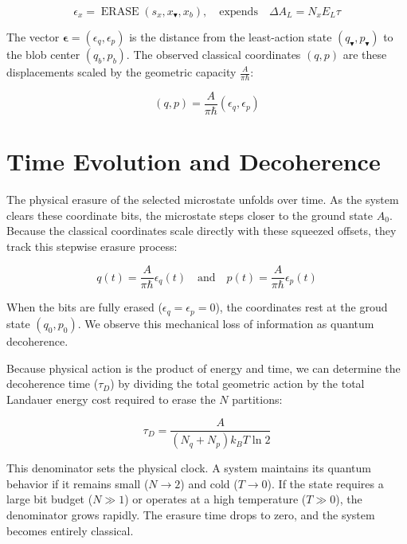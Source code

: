 \documentclass[%
  aps, reprint, prl, amsmath,amssymb
]{revtex4-2}
\begin{document}
\begin{equation}
\label{eq:ErasureFunction}
\epsilon_x = \operatorname{ERASE}(s_x, x_\blacktriangledown, x_b), \quad \text{expends} \quad \Delta A_L = N_x E_L \tau
\end{equation}

The vector $\mathbf{\epsilon} = (\epsilon_q,\epsilon_p)$ is the distance from the least-action state $(q_\blacktriangledown, p_\blacktriangledown)$ to the blob center $(q_b, p_b)$. The observed classical coordinates $(q,p)$ are these displacements scaled by the geometric capacity $\frac{A}{\pi \hbar}$:

\begin{equation}
\label{eq:ObservedCoordinates}
(q,p) = \frac{A}{\pi \hbar} (\epsilon_q,\epsilon_p)
\end{equation}

\section{Time Evolution and Decoherence}

The physical erasure of the selected microstate unfolds over time. As the system clears these coordinate bits, the microstate steps closer to the ground state $A_0$. Because the classical coordinates scale directly with these squeezed offsets, they track this stepwise erasure process:

\begin{equation}
\label{eq:TimeEvolutionCoordinates}
q(t) = \frac{A}{\pi \hbar} \epsilon_q(t) \quad \text{and} \quad p(t) = \frac{A}{\pi \hbar} \epsilon_p(t)
\end{equation}

When the bits are fully erased ($\epsilon_q = \epsilon_p = 0$), the coordinates rest at the groud state $(q_0, p_0)$. We observe this mechanical loss of information as quantum decoherence.

Because physical action is the product of energy and time, we can determine the decoherence time ($\tau_D$) by dividing the total geometric action by the total Landauer energy cost required to erase the $N$ partitions:

\begin{equation}
\label{eq:DecoherenceTime}
\tau_D = \frac{A}{(N_q + N_p) k_B T \ln 2}
\end{equation}

This denominator sets the physical clock. A system maintains its quantum behavior if it remains small ($N \to 2$) and cold ($T \to 0$). If the state requires a large bit budget ($N \gg 1$) or operates at a high temperature ($T \gg 0$), the denominator grows rapidly. The erasure time drops to zero, and the system becomes entirely classical.
\end{document}
